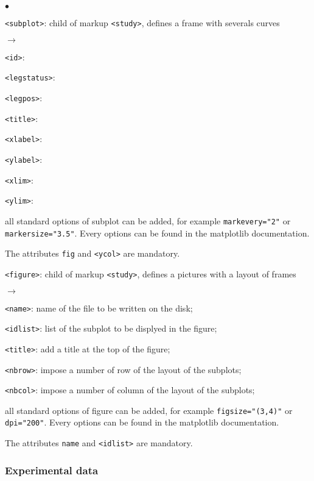 \documentclass[a4paper,10pt,twoside]{article}
\begin{document}
\begin{list}{$\bullet$}{}
\item \texttt{<subplot>}: child of markup \texttt{<study>}, defines a frame with severals curves
\begin{list}{$\rightarrow$}{}
\item \texttt{<id>}:
\item \texttt{<legstatus>}:
\item \texttt{<legpos>}:
\item \texttt{<title>}:
\item \texttt{<xlabel>}:
\item \texttt{<ylabel>}:
\item \texttt{<xlim>}:
\item \texttt{<ylim>}:
\item all standard options of subplot can be added, for example \texttt{markevery="2"}
or \texttt{markersize="3.5"}. Every options can be found in the matplotlib documentation.

The attributes \texttt{fig} and \texttt{<ycol>} are mandatory.
\end{list}

\item \texttt{<figure>}: child of markup \texttt{<study>}, defines a pictures with a layout of frames
\begin{list}{$\rightarrow$}{}
\item \texttt{<name>}: name of the file to be written on the disk;
\item \texttt{<idlist>}: list of the subplot to be displyed in the figure;
\item \texttt{<title>}: add a title at the top of the figure;
\item \texttt{<nbrow>}: impose a  number of row of the layout of the subplots;
\item \texttt{<nbcol>}: impose a  number of column of the layout of the subplots;
\item all standard options of figure can be added, for example \texttt{figsize="(3,4)"}
or \texttt{dpi="200"}. Every options can be found in the matplotlib documentation.

The attributes \texttt{name} and \texttt{<idlist>} are mandatory.
\end{list}

\end{list}

\subsubsection{Experimental data}
\end{document}
